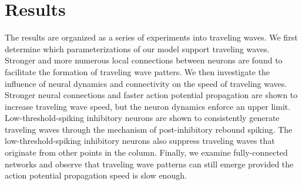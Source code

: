 \documentclass[a4paper,11pt]{article}
\begin{document}
\FloatBarrier

\section{Results}
The results are organized as a series of experiments into traveling waves.
We first determine which parameterizations of our model support traveling waves.
Stronger and more numerous local connections between neurons are found to facilitate the formation of traveling wave patters.
We then investigate the influence of neural dynamics and connectivity on the speed of traveling waves.
Stronger neural connections and faster action potential propagation are shown to increase traveling wave speed, but the neuron dynamics enforce an upper limit. 
Low-threshold-spiking inhibitory neurons are shown to consistently generate traveling waves through the mechanism of post-inhibitory rebound spiking.
The low-threshold-spiking inhibitory neurons also suppress traveling waves that originate from other points in the column.
Finally, we examine fully-connected networks and observe that traveling wave patterns can still emerge provided the action potential propagation speed is slow enough.
\end{document}
